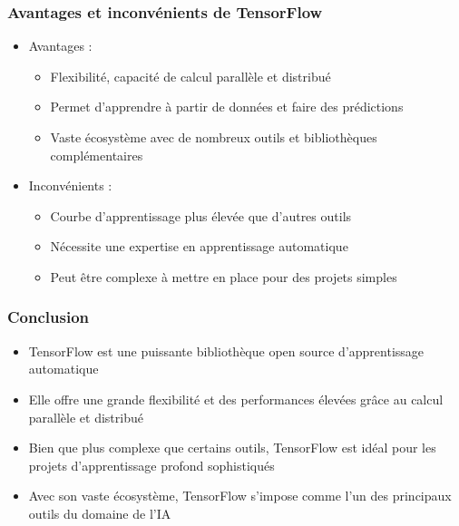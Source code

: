 \documentclass{beamer}
\begin{document}
	\begin{frame}
		\frametitle{Avantages et inconvénients de TensorFlow}
		\begin{itemize}
			\item Avantages :
			\begin{itemize}
				\item Flexibilité, capacité de calcul parallèle et distribué
				\item Permet d'apprendre à partir de données et faire des prédictions
				\item Vaste écosystème avec de nombreux outils et bibliothèques complémentaires
			\end{itemize}
			\item Inconvénients :
			\begin{itemize}
				\item Courbe d'apprentissage plus élevée que d'autres outils
				\item Nécessite une expertise en apprentissage automatique
				\item Peut être complexe à mettre en place pour des projets simples
			\end{itemize}
		\end{itemize}
	\end{frame}
	
	\begin{frame}
		\frametitle{Conclusion}
		\begin{itemize}
			\item TensorFlow est une puissante bibliothèque open source d'apprentissage automatique
			\item Elle offre une grande flexibilité et des performances élevées grâce au calcul parallèle et distribué
			\item Bien que plus complexe que certains outils, TensorFlow est idéal pour les projets d'apprentissage profond sophistiqués
			\item Avec son vaste écosystème, TensorFlow s'impose comme l'un des principaux outils du domaine de l'IA
		\end{itemize}
	\end{frame}
	
\end{document}
